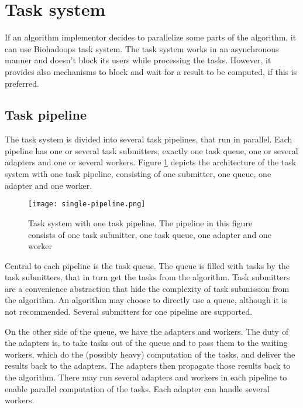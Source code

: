  

\section{Task system}
\label{chap:impl:task-system}
  If an algorithm implementor decides to parallelize some parts of the algorithm, it can use Biohadoops task system. The task system works in an asynchronous manner and doesn't block its users while processing the tasks. However, it provides also mechanisms to block and wait for a result to be computed, if this is preferred.
  
  \subsection{Task pipeline}
  \label{chap:impl:task-pipeline}
  The task system is divided into several task pipelines, that run in parallel. Each pipeline has one or several task submitters, exactly one task queue, one or several adapters and one or several workers. Figure \ref{fig:single-pipeline} depicts the architecture of the task system with one task pipeline, consisting of one submitter, one queue, one adapter and one worker.
  
  \begin{figure}[ht!]
    \centering
    \texttt{[image: single-pipeline.png]}
    \caption{Task system with one task pipeline. The pipeline in this figure consists of one task submitter, one task queue, one adapter and one worker}
    \label{fig:single-pipeline}
  \end{figure}
  
  Central to each pipeline is the task queue. The queue is filled with tasks by the task submitters, that in turn get the tasks from the algorithm. Task submitters are a convenience abstraction that hide the complexity of task submission from the algorithm. An algorithm may choose to directly use a queue, although it is not recommended. Several submitters for one pipeline are supported.
  
  On the other side of the queue, we have the adapters and workers. The duty of the adapters is, to take tasks out of the queue and to pass them to the waiting workers, which do the (possibly heavy) computation of the tasks, and deliver the results back to the adapters. The adapters then propagate those results back to the algorithm. There may run several adapters and workers in each pipeline to enable parallel computation of the tasks. Each adapter can handle several workers.
  
